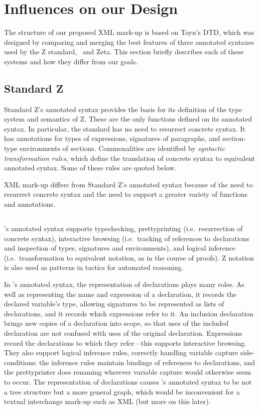 \documentclass{llncs}  %
\newcommand{\Zeta}{Zeta}
\begin{document}
\section{Influences on our Design}

The structure of our proposed XML mark-up is based on Toyn's DTD,
which was designed by comparing and merging the best features
of three annotated syntaxes used by the Z standard, \CADiZ\ and \Zeta.
This section briefly describes each of these systems and how they
differ from our goals.

\subsection{Standard Z}

Standard Z's annotated syntax provides the basis for its definition
of the type system and semantics of Z.
These are the only functions defined on its annotated syntax.
In particular, the standard has no need to resurrect concrete syntax.
It has annotations for types of expressions,
signatures of paragraphs, and section-type environments of sections.
Commonalities are identified by \textit{syntactic transformation rules},
which define the translation of concrete syntax to equivalent annotated syntax.
Some of these rules are quoted below.

XML mark-up differs from Standard Z's annotated syntax
because of the need to resurrect concrete syntax
and the need to support a greater variety of functions and annotations.

\subsection{\CADiZ}

\CADiZ's annotated syntax supports typechecking,
prettyprinting (i.e.\ resurrection of concrete syntax),
interactive browsing (i.e.\ tracking of references to declarations
and inspection of types, signatures and environments),
and logical inference (i.e.\ transformation to equivalent notation,
as in the course of proofs).
Z notation is also used as patterns in tactics for automated reasoning.

In \CADiZ's annotated syntax,
the representation of declarations plays many roles.
As well as representing the name and expression of a declaration,
it records the declared variable's type,
allowing signatures to be represented as lists of declarations,
and it records which expressions refer to it.
An inclusion declaration brings new copies of a declaration into scope,
so that uses of the included declaration are not
confused with uses of the original declaration.
Expressions record the declarations to which they refer---this
supports interactive browsing.
They also support logical inference rules, correctly handling
variable capture side-conditions:
the inference rules maintain bindings of references to declarations,
and the prettyprinter does renaming
wherever variable capture would otherwise seem to occur.
The representation of declarations causes \CADiZ's annotated syntax
to be not a tree structure but a more general graph,
which would be inconvenient for a textual interchange mark-up such as XML
(but more on this later).
\end{document}

